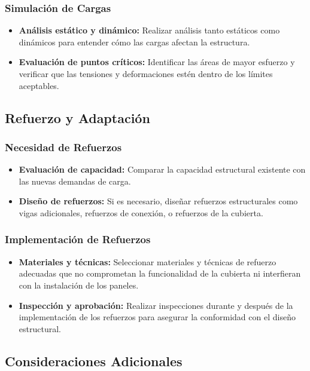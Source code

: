 \documentclass{article}
\begin{document}
\subsubsection*{Simulación de Cargas}
\begin{itemize}
    \item \textbf{Análisis estático y dinámico:} Realizar análisis tanto estáticos como dinámicos para entender cómo las cargas afectan la estructura.
    \item \textbf{Evaluación de puntos críticos:} Identificar las áreas de mayor esfuerzo y verificar que las tensiones y deformaciones estén dentro de los límites aceptables.
\end{itemize}

\subsection*{Refuerzo y Adaptación}

\subsubsection*{Necesidad de Refuerzos}
\begin{itemize}
    \item \textbf{Evaluación de capacidad:} Comparar la capacidad estructural existente con las nuevas demandas de carga.
    \item \textbf{Diseño de refuerzos:} Si es necesario, diseñar refuerzos estructurales como vigas adicionales, refuerzos de conexión, o refuerzos de la cubierta.
\end{itemize}

\subsubsection*{Implementación de Refuerzos}
\begin{itemize}
    \item \textbf{Materiales y técnicas:} Seleccionar materiales y técnicas de refuerzo adecuadas que no comprometan la funcionalidad de la cubierta ni interfieran con la instalación de los paneles.
    \item \textbf{Inspección y aprobación:} Realizar inspecciones durante y después de la implementación de los refuerzos para asegurar la conformidad con el diseño estructural.
\end{itemize}

\subsection*{Consideraciones Adicionales}
\end{document}

